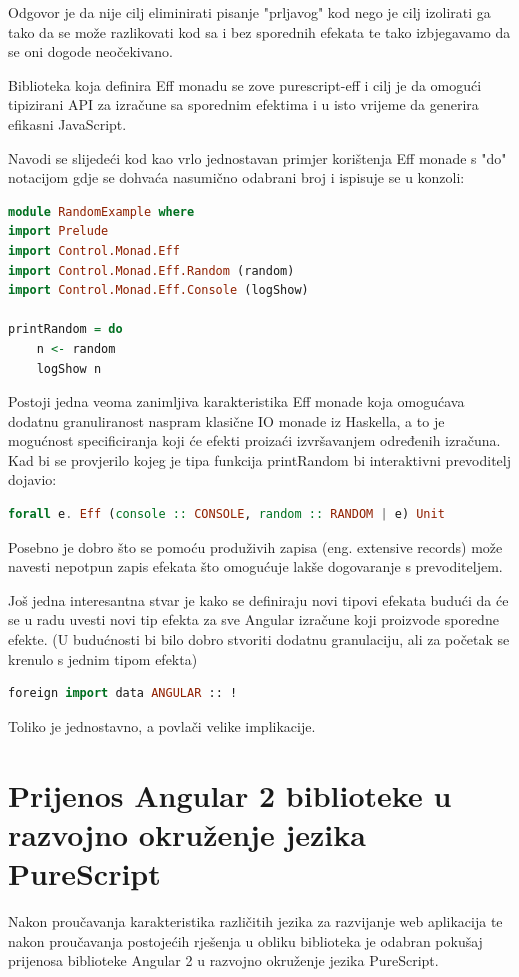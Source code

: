 \documentclass[times, utf8, zavrsni]{fer}
\begin{document}
Odgovor je da nije cilj eliminirati pisanje "prljavog" kod nego je cilj izolirati ga tako da se može razlikovati kod sa i bez sporednih efekata te tako izbjegavamo da se oni dogode neočekivano.

Biblioteka koja definira Eff monadu se zove purescript-eff i cilj je da omogući tipizirani API za izračune sa sporednim efektima i u isto vrijeme da generira efikasni JavaScript. 

Navodi se slijedeći kod kao vrlo jednostavan primjer korištenja Eff monade s "do" notacijom gdje se dohvaća nasumično odabrani broj i ispisuje se u konzoli:

\begin{lstlisting}[language=PureScript, basicstyle=\small\linespread{0.8}]
module RandomExample where
import Prelude
import Control.Monad.Eff
import Control.Monad.Eff.Random (random)
import Control.Monad.Eff.Console (logShow)

printRandom = do
	n <- random
    logShow n
\end{lstlisting}

Postoji jedna veoma zanimljiva karakteristika Eff monade koja omogućava dodatnu granuliranost naspram klasične IO monade iz Haskella, a to je mogućnost specificiranja koji će efekti proizaći izvršavanjem određenih izračuna. Kad bi se provjerilo kojeg je tipa funkcija printRandom bi  interaktivni prevoditelj dojavio:

\begin{lstlisting}[language=PureScript, basicstyle=\small\linespread{0.8}]
forall e. Eff (console :: CONSOLE, random :: RANDOM | e) Unit
\end{lstlisting}

Posebno je dobro što se pomoću produživih zapisa (eng. extensive records) može navesti nepotpun zapis efekata što omogućuje lakše dogovaranje s prevoditeljem.

Još jedna interesantna stvar je kako se definiraju novi tipovi efekata budući da će se u radu uvesti novi tip efekta za sve Angular izračune koji proizvode sporedne efekte. (U budućnosti bi bilo dobro stvoriti dodatnu granulaciju, ali za početak se krenulo s jednim tipom efekta)

\begin{lstlisting}[language=PureScript, basicstyle=\small\linespread{0.8}]
foreign import data ANGULAR :: !
\end{lstlisting}

Toliko je jednostavno, a povlači velike implikacije.

\chapter{Prijenos Angular 2 biblioteke u razvojno okruženje jezika PureScript}
Nakon proučavanja karakteristika različitih jezika za razvijanje web aplikacija te nakon proučavanja postojećih rješenja u obliku biblioteka je odabran pokušaj prijenosa biblioteke Angular 2 u razvojno okruženje jezika PureScript.
\end{document}
